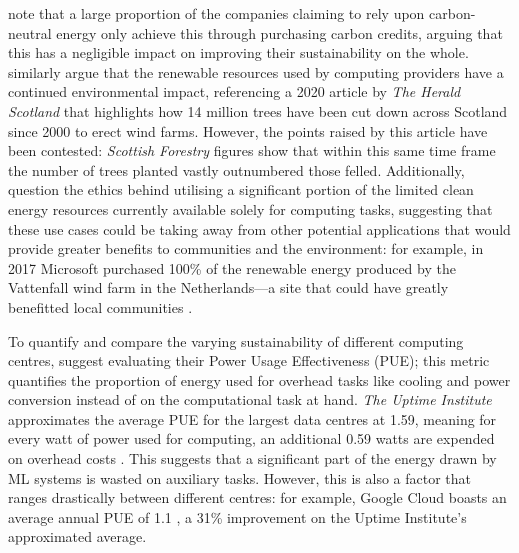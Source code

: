 \documentclass[a4paper, 12pt]{article}
\begin{document}
    \citet{schwartz-2019} note that a large proportion of the companies claiming to rely upon carbon-neutral energy only achieve this through purchasing carbon credits, arguing that this has a negligible impact on improving their sustainability on the whole. \citet{bender-2021} similarly argue that the renewable resources used by computing providers have a continued environmental impact, referencing a 2020 article by \emph{The Herald Scotland} that highlights how 14 million trees have been cut down across Scotland since 2000 to erect wind farms. However, the points raised by this article have been contested: \emph{Scottish Forestry} figures show that within this same time frame the number of trees planted vastly outnumbered those felled. Additionally, \citet{bender-2021} question the ethics behind utilising a significant portion of the limited clean energy resources currently available solely for computing tasks, suggesting that these use cases could be taking away from other potential applications that would provide greater benefits to communities and the environment: for example, in 2017 Microsoft purchased 100\% of the renewable energy produced by the Vattenfall wind farm in the Netherlands---a site that could have greatly benefitted local communities \citep{microsoft-news}.

    To quantify and compare the varying sustainability of different computing centres, \citet{lacoste-2019} suggest evaluating their Power Usage Effectiveness (PUE); this metric quantifies the proportion of energy used for overhead tasks like cooling and power conversion instead of on the computational task at hand. \emph{The Uptime Institute} approximates the average PUE for the largest data centres at 1.59, meaning for every watt of power used for computing, an additional 0.59 watts are expended on overhead costs \citep{data-center-survey}. This suggests that a significant part of the energy drawn by ML systems is wasted on auxiliary tasks. However, this is also a factor that ranges drastically between different centres: for example, Google Cloud boasts an average annual PUE of 1.1 \citep{google-2021}, a 31\% improvement on the Uptime Institute's approximated average.
\end{document}

